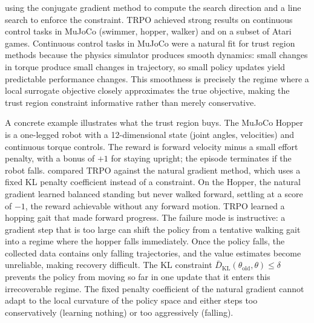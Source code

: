 using the conjugate gradient method to compute the search direction and a line search to enforce the constraint. TRPO achieved strong results on continuous control tasks in MuJoCo (swimmer, hopper, walker) and on a subset of Atari games. Continuous control tasks in MuJoCo were a natural fit for trust region methods because the physics simulator produces smooth dynamics: small changes in torque produce small changes in trajectory, so small policy updates yield predictable performance changes. This smoothness is precisely the regime where a local surrogate objective closely approximates the true objective, making the trust region constraint informative rather than merely conservative.

A concrete example illustrates what the trust region buys. The MuJoCo Hopper is a one-legged robot with a 12-dimensional state (joint angles, velocities) and continuous torque controls. The reward is forward velocity minus a small effort penalty, with a bonus of $+1$ for staying upright; the episode terminates if the robot falls. \citet{Schulman2015} compared TRPO against the natural gradient method, which uses a fixed KL penalty coefficient instead of a constraint. On the Hopper, the natural gradient learned balanced standing but never walked forward, settling at a score of $-1$, the reward achievable without any forward motion. TRPO learned a hopping gait that made forward progress. The failure mode is instructive: a gradient step that is too large can shift the policy from a tentative walking gait into a regime where the hopper falls immediately. Once the policy falls, the collected data contains only falling trajectories, and the value estimates become unreliable, making recovery difficult. The KL constraint $\bar{D}_{\mathrm{KL}}(\theta_{\mathrm{old}}, \theta) \leq \delta$ prevents the policy from moving so far in one update that it enters this irrecoverable regime. The fixed penalty coefficient of the natural gradient cannot adapt to the local curvature of the policy space and either steps too conservatively (learning nothing) or too aggressively (falling).

